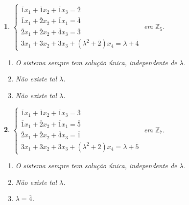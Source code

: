 \documentclass[12pt]{exam}
\newtheorem{exercicio}{}
\newcommand{\integer}{\mathbb{Z}}
\begin{document}
\begin{exercicio}
$\begin{cases}
  \overline{1}x_1 + \overline{1}x_2 + \overline{1}x_3= \overline{2}\\
  \overline{1}x_1 + \overline{2}x_2 + \overline{1}x_1 = \overline{4}\\
  \overline{2}x_1 + \overline{2}x_2 + \overline{4}x_3 = \overline{3}\\
  \overline{3}x_1 + \overline{3}x_2 + \overline{3}x_3 + (\lambda^2 + \overline{2})x_4 = \lambda + \overline{4}
\end{cases}$ em $\integer_5$.
\begin{solucao}
  \begin{enumerate}[label={\alph*})]
    \item O sistema sempre tem solu\c{c}\~ao \'unica, independente de $\lambda$.
    \item N\~ao existe tal $\lambda$.
    \item N\~ao existe tal $\lambda$.
  \end{enumerate}
\end{solucao}
\end{exercicio}

\begin{exercicio}
$\begin{cases}
  \overline{1}x_1 + \overline{1}x_2 + \overline{1}x_3 = \overline{3}\\
  \overline{1}x_1 + \overline{2}x_2 + \overline{1}x_1 = \overline{5}\\
  \overline{2}x_1 + \overline{2}x_2 + \overline{4}x_3 = \overline{1}\\
  \overline{3}x_1 + \overline{3}x_2 + \overline{3}x_3 + (\lambda^2 + \overline{2})x_4 = \lambda + \overline{5}
\end{cases}$ em $\integer_7$.
\begin{solucao}
  \begin{enumerate}[label={\alph*})]
    \item O sistema sempre tem solu\c{c}\~ao \'unica, independente de $\lambda$.
    \item N\~ao existe tal $\lambda$.
    \item $\lambda = \overline{4}$.
  \end{enumerate}
\end{solucao}
\end{exercicio}
\end{document}
